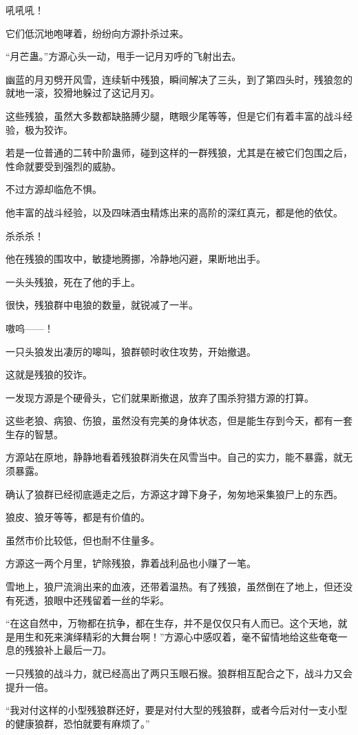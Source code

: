 \begin{this_body}
吼吼吼！

它们低沉地咆哮着，纷纷向方源扑杀过来。

“月芒蛊。”方源心头一动，甩手一记月刃呼的飞射出去。

幽蓝的月刃劈开风雪，连续斩中残狼，瞬间解决了三头，到了第四头时，残狼忽的就地一滚，狡猾地躲过了这记月刃。

这些残狼，虽然大多数都缺胳膊少腿，瞎眼少尾等等，但是它们有着丰富的战斗经验，极为狡诈。

若是一位普通的二转中阶蛊师，碰到这样的一群残狼，尤其是在被它们包围之后，性命就要受到强烈的威胁。

不过方源却临危不惧。

他丰富的战斗经验，以及四味酒虫精炼出来的高阶的深红真元，都是他的依仗。

杀杀杀！

他在残狼的围攻中，敏捷地腾挪，冷静地闪避，果断地出手。

一头头残狼，死在了他的手上。

很快，残狼群中电狼的数量，就锐减了一半。

嗷呜——！

一只头狼发出凄厉的嗥叫，狼群顿时收住攻势，开始撤退。

这就是残狼的狡诈。

一发现方源是个硬骨头，它们就果断撤退，放弃了围杀狩猎方源的打算。

这些老狼、病狼、伤狼，虽然没有完美的身体状态，但是能生存到今天，都有一套生存的智慧。

方源站在原地，静静地看着残狼群消失在风雪当中。自己的实力，能不暴露，就无须暴露。

确认了狼群已经彻底遁走之后，方源这才蹲下身子，匆匆地采集狼尸上的东西。

狼皮、狼牙等等，都是有价值的。

虽然市价比较低，但也耐不住量多。

方源这一两个月里，铲除残狼，靠着战利品也小赚了一笔。

雪地上，狼尸流淌出来的血液，还带着温热。有了残狼，虽然倒在了地上，但还没有死透，狼眼中还残留着一丝的华彩。

“在这自然中，万物都在抗争，都在生存，并不是仅仅只有人而已。这个天地，就是用生和死来演绎精彩的大舞台啊！”方源心中感叹着，毫不留情地给这些奄奄一息的残狼补上最后一刀。

一只残狼的战斗力，就已经高出了两只玉眼石猴。狼群相互配合之下，战斗力又会提升一倍。

“我对付这样的小型残狼群还好，要是对付大型的残狼群，或者今后对付一支小型的健康狼群，恐怕就要有麻烦了。”


\end{this_body}
